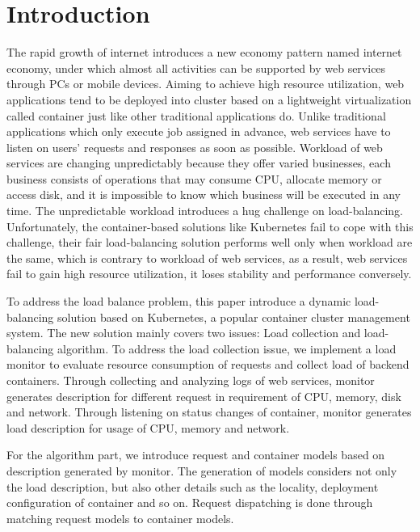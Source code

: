 \section{Introduction}
\label{sec:introduction}

The rapid growth of internet introduces a new economy pattern named internet economy, under which almost all activities can be supported by web services through PCs or mobile devices. Aiming to achieve high resource utilization, web applications tend to be deployed into cluster based on a lightweight virtualization called container just like other traditional applications do. Unlike traditional applications which only execute job assigned in advance, web services have to listen on users'  requests and responses as soon as possible. Workload of web services are changing unpredictably because they offer varied businesses, each business consists of operations that may consume CPU, allocate memory or access disk, and it is impossible to know which business will be executed in any time. The unpredictable workload introduces a hug challenge on load-balancing. Unfortunately, the container-based solutions like Kubernetes fail to cope with this challenge, their fair load-balancing solution performs well only when workload are the same, which is contrary to workload of web services, as a result, web services fail to gain high resource utilization, it loses stability and performance conversely.

To address the load balance problem, this paper introduce a dynamic load-balancing solution based on Kubernetes, a popular container cluster management system. The new solution mainly covers two issues: Load collection and load-balancing algorithm.
 To address the load collection issue, we implement a load monitor to evaluate resource consumption of requests and collect load of backend containers. Through collecting and analyzing logs of web services, monitor generates description for different request in requirement of CPU, memory, disk and network. Through listening on status changes of container, monitor generates load description for usage of CPU, memory and network.

For the algorithm part, we introduce request and container models based on description generated by monitor. The generation of models considers not only the load description, but also other details such as the locality, deployment configuration of container and so on. Request dispatching is done through matching request models to container models.

